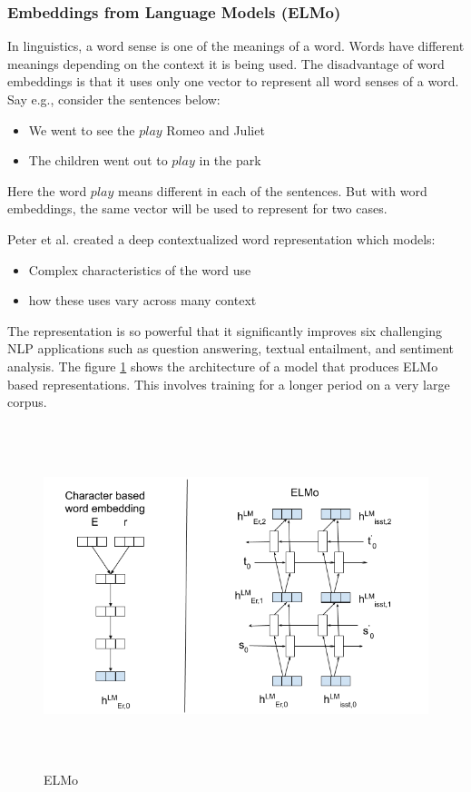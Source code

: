 \documentclass[a4paper, 11pt]{article}
\begin{document}
\subsubsection{Embeddings from Language Models (ELMo)}
In linguistics, a word sense is one of the meanings of a word. Words have different meanings depending on the context it is being used. The disadvantage of word embeddings is that it uses only one vector to represent all word senses of a word.  Say e.g., consider the sentences below:
\begin{itemize}
\item We went to see the $play$ Romeo and Juliet
\item The children went out to $play$ in the park
\end{itemize}
Here the word $play$ means different in each of the sentences. But with word embeddings, the same vector will be used to represent for two cases. 

Peter et al. \parencite{peters2018deep} created a deep contextualized word representation which models:
\begin{itemize}
\item Complex characteristics of the word use
\item how these uses vary across many context                   
\end{itemize}

The representation is so powerful that it significantly improves six challenging NLP applications such as question answering, textual entailment, and sentiment analysis. The figure \ref{fig:ELMO} shows the architecture of a model that produces ELMo based representations. This involves training for a longer period on a very large corpus.

\begin{figure}[H]
    \centering
    \includegraphics[width=\textwidth,height=10cm,keepaspectratio=true]
    {elmo-1.png}
    \caption{
        ELMo
    }
    \label{fig:ELMO}
\end{figure}
\end{document}
